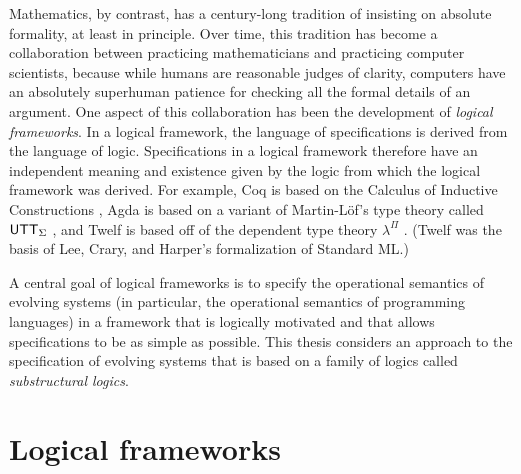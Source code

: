 Mathematics, by contrast, has a century-long tradition of insisting on
absolute formality, at least in principle. Over time, this tradition
has become a collaboration between practicing mathematicians and
practicing computer scientists, because while humans are reasonable
judges of clarity, computers have an absolutely superhuman patience
for checking all the formal details of an argument. One aspect of this
collaboration has been the development of {\it logical frameworks}. In
a logical framework, the language of specifications is derived from
the language of logic. Specifications in a logical framework therefore
have an independent meaning and existence given by the logic from
which the logical framework was derived. For example, Coq is based on
the Calculus of Inductive Constructions \cite{coq10coq}, Agda is based
on a variant of Martin-L\"of's type theory called ${\sf UTT}_\Sigma$
\cite{norell08towards}, and Twelf is based off of the dependent type
theory $\lambda^\Pi$ \cite{pfenning99system}. (Twelf was the basis of
Lee, Crary, and Harper's formalization of Standard ML.)



A central goal of logical frameworks is to specify the operational
semantics of evolving systems (in particular, the operational
semantics of programming languages) in a framework that is logically
motivated and that allows specifications to be as simple as possible.
This thesis considers an approach to the specification of evolving
systems that is based on a family of logics called {\it substructural
  logics}.

\section{Logical frameworks}

